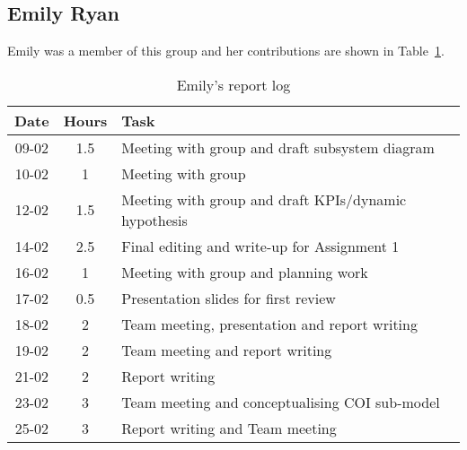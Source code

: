 
\subsection{Emily Ryan}
Emily was a member of this group and her contributions are shown in Table~\ref{tab:emily_log}. 
\begin{longtable}[c]{c|c|m{35em}}
\caption{Emily's report log}
\label{tab:emily_log}\\
\textbf{Date}& \textbf{Hours} & \textbf{Task} \\
\hline
\endfirsthead
%
\endhead
%
 09-02  &   1.5    & Meeting with group and draft subsystem diagram  \\
 10-02  &    1   & Meeting with group  \\
 12-02  &    1.5   & Meeting with group and draft KPIs/dynamic hypothesis  \\
 14-02  & 2.5  & Final editing and write-up for Assignment 1\\
 16-02 & 1 & Meeting with group and planning work\\
 17-02 & 0.5 & Presentation slides for first review\\
 18-02 & 2 & Team meeting, presentation and report writing\\
 19-02 & 2 & Team meeting and report writing\\
 21-02 & 2 & Report writing\\
 23-02 & 3 & Team meeting and conceptualising COI sub-model\\
 25-02 & 3 & Report writing and Team meeting\\
 
\end{longtable}

